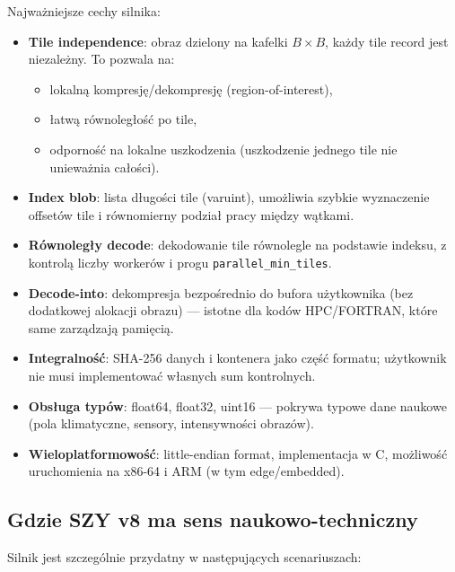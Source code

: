 \documentclass[11pt,a4paper]{article}
\begin{document}
Najważniejsze cechy silnika:
\begin{itemize}
  \item \textbf{Tile independence}: obraz dzielony na kafelki $B\times B$, każdy tile record jest niezależny. To pozwala na:
        \begin{itemize}
          \item lokalną kompresję/dekompresję (region-of-interest),
          \item łatwą równoległość po tile,
          \item odporność na lokalne uszkodzenia (uszkodzenie jednego tile nie unieważnia całości).
        \end{itemize}
  \item \textbf{Index blob}: lista długości tile (varuint), umożliwia szybkie wyznaczenie offsetów tile i równomierny podział pracy między wątkami.
  \item \textbf{Równoległy decode}: dekodowanie tile równolegle na podstawie indeksu, z kontrolą liczby workerów i progu \texttt{parallel\_min\_tiles}.
  \item \textbf{Decode-into}: dekompresja bezpośrednio do bufora użytkownika (bez dodatkowej alokacji obrazu) --- istotne dla kodów HPC/FORTRAN, które same zarządzają pamięcią.
  \item \textbf{Integralność}: SHA-256 danych i kontenera jako część formatu; użytkownik nie musi implementować własnych sum kontrolnych.
  \item \textbf{Obsługa typów}: float64, float32, uint16 --- pokrywa typowe dane naukowe (pola klimatyczne, sensory, intensywności obrazów).
  \item \textbf{Wieloplatformowość}: little-endian format, implementacja w C, możliwość uruchomienia na x86-64 i ARM (w tym edge/embedded).
\end{itemize}

\subsection{Gdzie SZY v8 ma sens naukowo-techniczny}
Silnik jest szczególnie przydatny w następujących scenariuszach:
\end{document}
